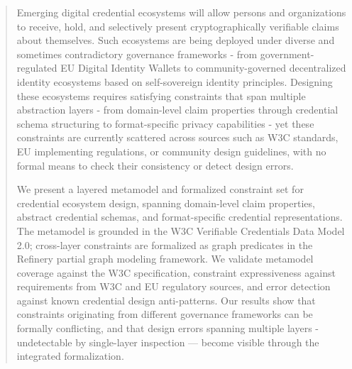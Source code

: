 \begin{abstract}
 Emerging digital credential ecosystems will allow persons and organizations to receive, hold, and selectively present cryptographically verifiable claims about themselves. Such ecosystems are being deployed under diverse and sometimes contradictory governance frameworks - from government-regulated EU Digital Identity Wallets to community-governed decentralized identity ecosystems based on self-sovereign identity principles. Designing these ecosystems requires satisfying constraints that span multiple abstraction layers - from domain-level claim properties through credential schema structuring to format-specific privacy capabilities - yet these constraints are currently scattered across sources such as W3C standards, EU implementing regulations, or community design guidelines, with no formal means to check their consistency or detect design errors.
 
 We present a layered metamodel and formalized constraint set for credential ecosystem design, spanning domain-level claim properties, abstract credential schemas, and format-specific credential representations. The metamodel is grounded in the W3C Verifiable Credentials Data Model 2.0; cross-layer constraints are formalized as graph predicates in the Refinery partial graph modeling framework. We validate metamodel coverage against the W3C specification, constraint expressiveness against requirements from W3C and EU regulatory sources, and error detection against known credential design anti-patterns. Our results show that constraints originating from different governance frameworks can be formally conflicting, and that design errors spanning multiple layers - undetectable by single-layer inspection — become visible through the integrated formalization.
\end{abstract}